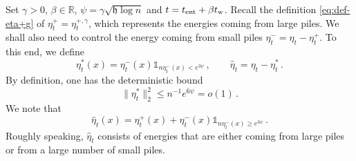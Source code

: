 \documentclass[11pt,reqno]{amsart}
\theoremstyle{remark}
\theoremstyle{definition}
\numberwithin{equation}{section}
\numberwithin{figure}{section}
\newcommand{\R}{\mathbb{R}}
\newcommand{\car}{\mathds{1}}
\begin{document}
	Set $\gamma>0$, $\beta\in\R$, $\psi=\gamma\sqrt{\mathfrak h\log n}$ and $t=t_{\rm ent}+\beta t_{\rm w}$. Recall the definition \eqref{eq:def-eta+g} of $\eta_{t}^+=\eta_t^{+,\gamma}$, which represents the energies coming from large piles. We shall also need to control the energy coming from small piles $\eta_{t}^-=\eta_{t}-\eta_{t}^+$. To this end, we define
\begin{equation}\label{eq:def-eta-star}
		\eta_{t}^*(x)=\eta_{t}^-(x)\car_{n\eta_{t}^-(x)< e^{3\psi}}\,,\qquad \widehat \eta_t = \eta_{t}-\eta_{t}^{*}\,.
	\end{equation}
	By definition, one has the deterministic bound 
\begin{equation}\label{eq:tous}
\|\eta_{t}^*\|_2^2 \le n^{-1}e^{6\psi}=o(1)\,.
\end{equation}
We note that 
	\[ \widehat \eta_t(x)=\eta_{t}^+(x) + \eta_{t}^-(x)\car_{n\eta_{t}^-(x)\ge e^{3\psi}}\,.
	\]
Roughly speaking, $\widehat \eta_t$	consists of energies that are either coming from large piles or from a large number of small piles.  
	
\end{document}
